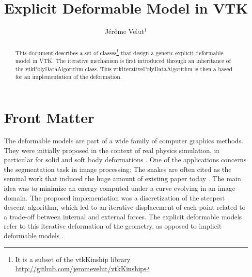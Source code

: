 \documentclass{InsightArticle}
\title{Explicit Deformable Model in VTK}
\author{J\'er\^ome Velut$^{1}$}
\newcommand{\IJhandlerIDnumber}{Xxxx}
\begin{document}
%
% 
\IJhandlefooter{\IJhandlerIDnumber}


\ifpdf
\else
\fi


\maketitle


\ifhtml
\chapter*{Front Matter\label{front}}
\fi


\begin{abstract}
\noindent
This document describes a set of classes\footnote{It is a subset of the
vtkKinship library \url{http://github.com/jeromevelut/vtkKinship}} that 
design a generic explicit deformable model in VTK. The iterative mechanism
is first introduced through an inheritance of the vtkPolyDataAlgorithm class. 
This vtkIterativePolyDataAlgorithm is then a based for an implementation of the
deformation. 
\end{abstract}

\IJhandlenote{\IJhandlerIDnumber}

\tableofcontents

The deformable models are part of a wide family of computer graphics methods.
They were initially proposed in the context of real physics simulation, 
in particular for solid and soft body deformations \cite{TERXX}. One of the
applications concerns the segmentation task in image processing:
The snakes \cite{KAS87} are often cited as the seminal work that induced the
huge amount of existing paper today \cite{MON01}. The main idea was to minimize
an energy computed under a curve evolving in an image domain. The proposed 
implementation was a discretization of the steepest descent algorithm, which
led to an iterative displacement of each point related to a trade-off between
internal and external forces. The explicit deformable models refer to this 
iterative deformation of the geometry, as opposed to implicit deformable
models \cite{}.
\end{document}
